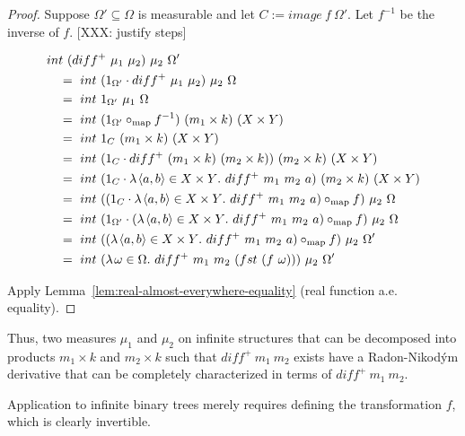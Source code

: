 \begin{proof}
Suppose $\Omega' \subseteq \Omega$ is measurable and let $C := image~f~\Omega'$.
Let $f^{-1}$ be the inverse of $f$.
[XXX: justify steps]
\begin{displaybreaks}
\begin{align*}
	&int~(diff^+~\mu_1~\mu_2)~\mu_2~\Omega'
\\*
	&\ \ \ =\ int~(1_{\Omega'} \cdot diff^+~\mu_1~\mu_2)~\mu_2~\Omega
\\
	&\ \ \ =\ int~1_{\Omega'}~\mu_1~\Omega
\\
	&\ \ \ =\ int~(1_{\Omega'} \circ_\mathrm{map} f^{-1})~(m_1 \times k)~(X \times Y)
\\
	&\ \ \ =\ int~1_C~(m_1 \times k)~(X \times Y)
\\
	&\ \ \ =\ int~(1_C \cdot diff^+~(m_1 \times k)~(m_2 \times k))~(m_2 \times k)~(X \times Y)
\\
	&\ \ \ =\ int~(1_C \cdot \lambda\mspace{2mu}{\langle{a,b}\rangle \in X \times Y}\ldotp\, diff^+~m_1~m_2~a)~(m_2 \times k)~(X \times Y)
\\
	&\ \ \ =\ int~((1_C \cdot \lambda\mspace{2mu}{\langle{a,b}\rangle \in X \times Y}\ldotp\, diff^+~m_1~m_2~a) \circ_\mathrm{map} f)~\mu_2~\Omega
\\
	&\ \ \ =\ int~(1_{\Omega'} \cdot (\lambda\mspace{2mu}{\langle{a,b}\rangle \in X \times Y}\ldotp\, diff^+~m_1~m_2~a) \circ_\mathrm{map} f)~\mu_2~\Omega
\\
	&\ \ \ =\ int~((\lambda\mspace{2mu}{\langle{a,b}\rangle \in X \times Y}\ldotp\, diff^+~m_1~m_2~a) \circ_\mathrm{map} f)~\mu_2~\Omega'
\\
	&\ \ \ =\ int~(\lambda\mspace{2mu}{\omega \in \Omega}\ldotp\, diff^+~m_1~m_2~(fst~(f~\omega)))~\mu_2~\Omega'
\end{align*}
\end{displaybreaks}
Apply Lemma~\ref{lem:real-almost-everywhere-equality} (real function a.e. equality).
\end{proof}

Thus, two measures $\mu_1$ and $\mu_2$ on infinite structures that can be decomposed into products $m_1 \times k$ and $m_2 \times k$ such that $diff^+~m_1~m_2$ exists have a Radon-Nikod\'ym derivative that can be completely characterized in terms of $diff^+~m_1~m_2$.

Application to infinite binary trees merely requires defining the transformation $f$, which is clearly invertible.

